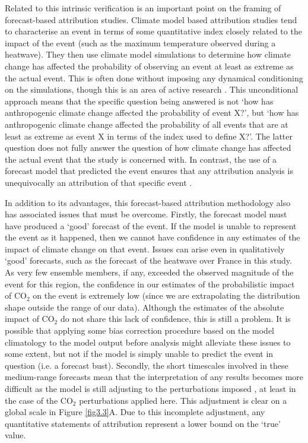   Related to this intrinsic verification is an important point on the framing of forecast-based attribution studies. Climate model based attribution studies tend to characterise an event in terms of some quantitative index closely related to the impact of the event (such as the maximum temperature observed during a heatwave). They then use climate model simulations to determine how climate change has affected the probability of observing an event at least as extreme as the actual event. This is often done without imposing any dynamical conditioning on the simulations, though this is an area of active research \citep{yiou_statistical_2017,pall_diagnosing_2017}. This unconditional approach means that the specific question being answered is not `how has anthropogenic climate change affected the probability of event X?', but `how has anthropogenic climate change affected the probability of all events that are at least as extreme as event X in terms of the index used to define X?'.  The latter question does not fully answer the question of how climate change has affected the actual event that the study is concerned with. In contrast, the use of a forecast model that predicted the event ensures that any attribution analysis is unequivocally an attribution of that specific event \citep{hope_determining_2019}.
  
  In addition to its advantages, this forecast-based attribution methodology also has associated issues that must be overcome. Firstly, the forecast model must have produced a `good' forecast of the event. If the model is unable to represent the event as it happened, then we cannot have confidence in any estimates of the impact of climate change on that event. Issues can arise even in qualitatively `good' forecasts, such as the forecast of the heatwave over France in this study. As very few ensemble members, if any, exceeded the observed magnitude of the event for this region, the confidence in our estimates of the probabilistic impact of CO$_2$ on the event is extremely low (since we are extrapolating the distribution shape outside the range of our data). Although the estimates of the absolute impact of CO$_2$ do not share this lack of confidence, this is still a problem. It is possible that applying some bias correction procedure \citep[e.g.][]{sippel_novel_2016,jeon_quantile-based_2016,li_reducing_2019} based on the model climatology to the model output before analysis might alleviate these issues to some extent, but not if the model is simply unable to predict the event in question (i.e. a forecast bust). Secondly, the short timescales involved in these medium-range forecasts mean that the interpretation of any results becomes more difficult as the model is still adjusting to the perturbations imposed \citep{hope_contributors_2015}, at least in the case of the CO$_2$ perturbations applied here. This adjustment is clear on a global scale in Figure \ref{fig3.3}A. Due to this incomplete adjustment, any quantitative statements of attribution represent a lower bound on the `true' value. 
  
